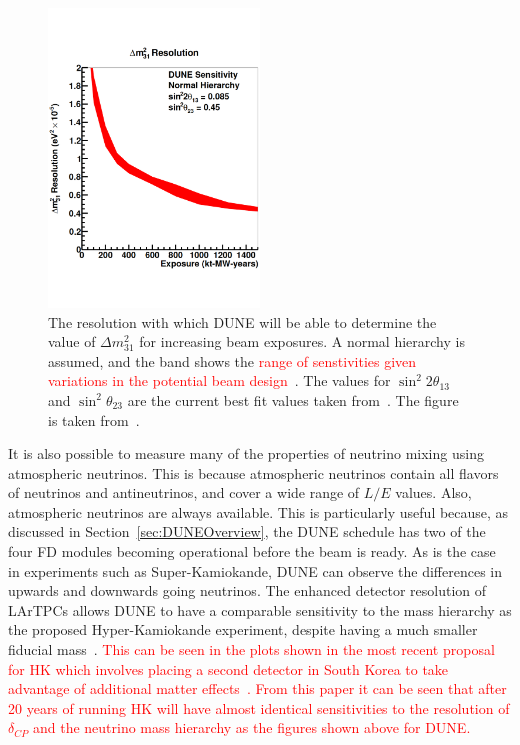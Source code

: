 \begin{figure}
  \centering
  \includegraphics[width=0.5\textwidth]{DUNEDeltaMRes}
  \caption[The resolution with which DUNE will be able to determine the value of $\Delta m^{2}_{31}$ for increasing beam exposures]
          {The resolution with which DUNE will be able to determine the value of $\Delta m^{2}_{31}$ for increasing beam exposures. A normal hierarchy is assumed, and the band shows the \textcolor{red}{range of senstivities given variations in the potential beam design}~\citep{DUNECDR_V3}. The values for $\sin^{2}2\theta_{13}$ and $\sin^{2}\theta_{23}$ are the current best fit values taken from~\citep{NuFit2014}. The figure is taken from~\citep{DUNECDR_V2}.}
  \label{fig:DUNEDeltaMRes}
\end{figure}

It is also possible to measure many of the properties of neutrino mixing using atmospheric neutrinos. This is because atmospheric neutrinos contain all flavors of neutrinos and antineutrinos, and cover a wide range of $L/E$ values. Also, atmospheric neutrinos are always available. This is particularly useful because, as discussed in Section~\ref{sec:DUNEOverview}, the DUNE schedule has two of the four FD modules becoming operational before the beam is ready. As is the case in experiments such as Super-Kamiokande, DUNE can observe the differences in upwards and downwards going neutrinos. The enhanced detector resolution of LArTPCs allows DUNE to have a comparable sensitivity to the mass hierarchy as the proposed Hyper-Kamiokande experiment, despite having a much smaller fiducial mass~\citep{DUNECDR_V2}. \textcolor{red}{This can be seen in the plots shown in the most recent proposal for HK which involves placing a second detector in South Korea to take advantage of additional matter effects~\citep{Abe:2016ero}. From this paper it can be seen that after 20 years of running HK will have almost identical sensitivities to the resolution of $\delta_{CP}$ and the neutrino mass hierarchy as the figures shown above for DUNE.} 

